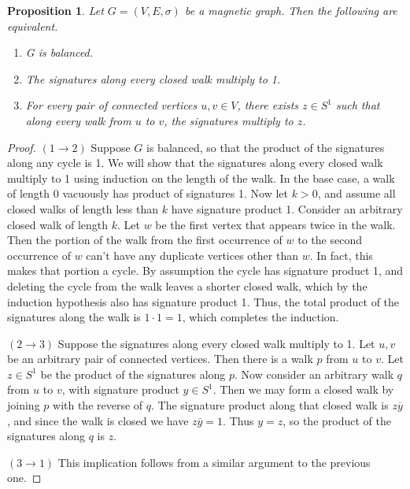 \documentclass{article}
\newtheorem{prop}[thm]{Proposition}
\theoremstyle{definition}
\begin{document}
\begin{prop}\label{equivalent conditions for balancedness}
    Let $G=(V, E, \sigma)$ be a magnetic graph. Then the following are equivalent.
    \begin{enumerate}
        \item G is balanced.
        \item The signatures along every closed walk multiply to 1.
        \item For every pair of connected vertices $u, v \in V$, there exists $z \in S^1$ such that along every walk from $u$ to $v$, the signatures multiply to $z$. 
    \end{enumerate}
\end{prop}
\begin{proof}
$(1 \rightarrow 2)$ Suppose $G$ is balanced, so that the product of the signatures along any cycle is 1. We will show that the signatures along every closed walk multiply to 1 using induction on the length of the walk. In the base case, a walk of length 0 vacuously has product of signatures 1. Now let $k > 0$, and assume all closed walks of length less than $k$ have signature product 1. Consider an arbitrary closed walk of length $k$. Let $w$ be the first vertex that appears twice in the walk. Then the portion of the walk from the first occurrence of $w$ to the second occurrence of $w$ can't have any duplicate vertices other than $w$. In fact, this makes that portion a cycle. By assumption the cycle has signature product 1, and deleting the cycle from the walk leaves a shorter closed walk, which by the induction hypothesis also has signature product 1. Thus, the total product of the signatures along the walk is $1 \cdot 1 = 1$, which completes the induction.  

$(2 \rightarrow 3)$ Suppose the signatures along every closed walk multiply to 1. Let $u, v$ be an arbitrary pair of connected vertices. Then there is a walk $p$ from $u$ to $v$. Let $z \in S^1$ be the product of the signatures along $p$. Now consider an arbitrary walk $q$ from $u$ to $v$, with signature product $y \in S^1$. Then we may form a closed walk by joining $p$ with the reverse of $q$. The signature product along that closed walk is $z \overline{y}$, and since the walk is closed we have $z \overline{y} = 1$. Thus $y = z$, so the product of the signatures along $q$ is $z$.

$(3 \rightarrow 1)$ This implication follows from a similar argument to the previous one.
\end{proof}
\end{document}
